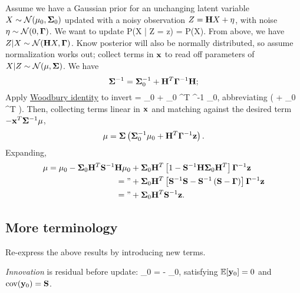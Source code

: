 \documentclass[notitlepage,openany,11pt]{report}
\DeclareMathOperator{\cov}{cov}
\theoremstyle{plain}%
\numberwithin{equation}{section}
\begin{document}
Assume we have a Gaussian prior for an unchanging latent variable $X \sim \mathcal{N}(\mathbf{\mu}_0, \mathbf{\Sigma}_0)$ updated with a noisy observation $Z = \mathbf{H}X + \mathbf{\eta}$, with noise $\eta \sim \mathcal{N}(0, \mathbf{\Gamma})$. We want to update
\be
P(X | Z = z) =  P(X).
\ee
From above, we have $Z | X \sim \mathcal{N}(\mathbf{H}X, \mathbf{\Gamma})$. Know posterior will also be normally distributed, so assume normalization works out; collect terms in $\mathbf{x}$ to read off parameters of $X | Z \sim \mathcal{N}(\mathbf{\mu}, \mathbf{\Sigma})$. We have
\begin{equation}
\label{eq-kal-1}
\mathbf{\Sigma}^{-1} = \mathbf{\Sigma}_0^{-1} + \mathbf{H}^{T} \mathbf{\Gamma}^{-1} \mathbf{H};
\end{equation}
Apply \href{https://en.wikipedia.org/wiki/Woodbury_matrix_identity}{Woodbury identity} to invert
\be
\mbf{\Sigma} = \mbf{\Sigma}_0 + \mbf{\Sigma}_0 ^{T} ^{-1}  \mbf{\Sigma}_0,
\ee
abbreviating
\be
{} \equiv \left( \mbf{\Gamma} +  \mbf{\Sigma}_{0} ^{T} \right).
\ee
Then, collecting terms linear in $\mathbf{x}$ and matching against the desired term $- \mathbf{x}^{T} \mathbf{\Sigma}^{-1} \mathbf{\mu}$,
\begin{equation}
\label{eq-kal-2}
\mathbf{\mu} = \mathbf{\Sigma}\left( \mathbf{\Sigma}_0^{-1} \mathbf{\mu}_{0} + \mathbf{H}^{T} \mathbf{\Gamma}^{-1}\mathbf{z} \right).
\end{equation}
Expanding,
\begin{align*}
\mathbf{\mu} = \mathbf{\mu}_0 - \mathbf{\Sigma}_0 \mathbf{H}^{T} \mathbf{S}^{-1} \mathbf{H} \mathbf{\mu}_0 &+ \mathbf{\Sigma}_0 \mathbf{H}^{T} \left[ 1 - \mathbf{S}^{-1} \mathbf{H} \mathbf{\Sigma}_{0} \mathbf{H}^{T} \right] \mathbf{\Gamma}^{-1} \mathbf{z} \\
 = \text{''} &+ \mathbf{\Sigma}_0 \mathbf{H}^{T} \left[ \mathbf{S}^{-1} \mathbf{S} - \mathbf{S}^{-1} \left( \mathbf{S} - \mathbf{\Gamma} \right) \right] \mathbf{\Gamma}^{-1} \mathbf{z} \\
  = \text{''} &+ \mathbf{\Sigma}_0 \mathbf{H}^{T} \mathbf{S}^{-1} \mathbf{z}.
\end{align*}

\subsection{More terminology}
Re-express the above results by introducing new terms. 

\emph{Innovation} is residual before update:
\be
{}_0 =  -  \mbf{\mu}_0,
\ee
satisfying $\mathbb{E}[\mathbf{y}_0] = 0$ and $\cov(\mbf{y}_0) = \mbf{S}$. 
\end{document}
